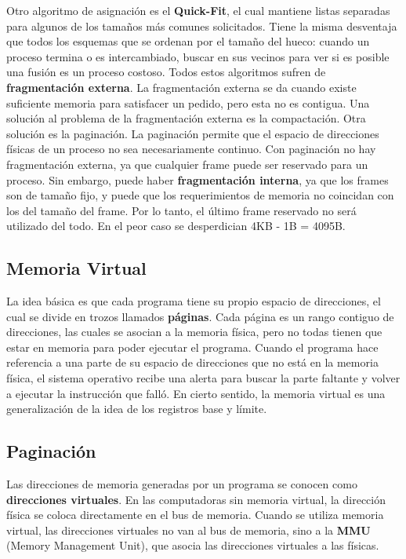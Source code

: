 \begin{itemize}
Otro algoritmo de asignación es el \textbf{Quick-Fit}, el cual mantiene listas separadas para algunos de los tamaños más comunes solicitados. Tiene la misma desventaja que todos los esquemas que se ordenan por el tamaño del hueco: cuando un proceso termina o es intercambiado, buscar en sus vecinos para ver si es posible una fusión es un proceso costoso. Todos estos algoritmos sufren de \textbf{fragmentación externa}. La fragmentación externa se da cuando existe suficiente memoria para satisfacer un pedido, pero esta no es contigua. Una solución al problema de la fragmentación externa es la compactación. Otra solución es la paginación. La paginación permite que el espacio de direcciones físicas de un proceso no sea necesariamente continuo. Con paginación no hay fragmentación externa, ya que cualquier frame puede ser reservado para un proceso. Sin embargo, puede haber \textbf{fragmentación interna}, ya que los frames son de tamaño fijo, y puede que los requerimientos de memoria no coincidan con los del tamaño del frame. Por lo tanto, el último frame reservado no será utilizado del todo. En el peor caso se desperdician 4KB - 1B = 4095B.

\end{itemize}


\subsection{Memoria Virtual}

La idea básica es que cada programa tiene su propio espacio de direcciones, el cual se divide en trozos llamados \textbf{páginas}. Cada página es un rango contiguo de direcciones, las cuales se asocian a la memoria física, pero no todas tienen que estar en memoria para poder ejecutar el programa. Cuando el programa hace referencia a una parte de su espacio de direcciones que no está en la memoria física, el sistema operativo recibe una alerta para buscar la parte faltante y volver a ejecutar la instrucción que falló. En cierto sentido, la memoria virtual es una generalización de la idea de los registros base y límite.

\subsection{Paginación}

Las direcciones de memoria generadas por un programa se conocen como \textbf{direcciones virtuales}. En las computadoras sin memoria virtual, la dirección física se coloca directamente en el bus de memoria. Cuando se utiliza memoria virtual, las direcciones virtuales no van al bus de memoria, sino a la \textbf{MMU} (Memory Management Unit), que asocia las direcciones virtuales a las físicas.

